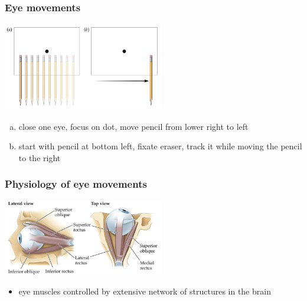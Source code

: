 \documentclass[]{beamer}
\begin{document}
\begin{frame}
 \frametitle{Eye movements}
\begin{overlayarea}{120mm}{80mm}
\begin{center}
\includegraphics[width=70mm]{figs/l7/eye_movement_demo.png} 
\end{center}
\begin{enumerate}[(a)]
 \item close one eye, focus on dot, move pencil from lower right to left
 \item start with pencil at bottom left, fixate eraser, track it while moving the pencil to the right
\end{enumerate}

\end{overlayarea}
\end{frame}


\begin{frame}
\frametitle{Physiology of eye movements}
\begin{overlayarea}{120mm}{70mm}
 \begin{center}
\includegraphics[width=70mm]{figs/l7/six_eye_muscles.png} 
\end{center}
\begin{itemize}
 \item eye muscles controlled by extensive network of structures in the brain
\end{itemize}

\end{overlayarea}
\end{frame}
\end{document}

